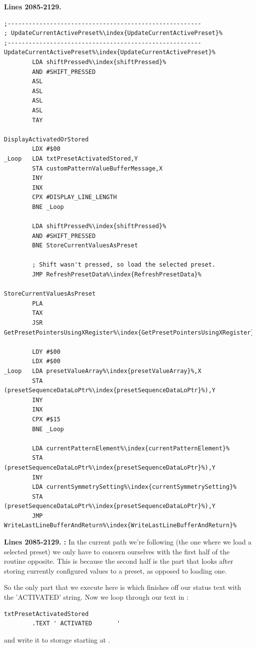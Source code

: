\clearpage
{}
\textbf{Lines 2085-2129. } 
\begin{lstlisting}[escapechar=\%]
;-------------------------------------------------------
; UpdateCurrentActivePreset%\index{UpdateCurrentActivePreset}%
;-------------------------------------------------------
UpdateCurrentActivePreset%\index{UpdateCurrentActivePreset}%    
        LDA shiftPressed%\index{shiftPressed}%
        AND #SHIFT_PRESSED
        ASL 
        ASL 
        ASL 
        ASL 
        TAY 

DisplayActivatedOrStored
        LDX #$00
_Loop   LDA txtPresetActivatedStored,Y
        STA customPatternValueBufferMessage,X
        INY 
        INX 
        CPX #DISPLAY_LINE_LENGTH
        BNE _Loop

        LDA shiftPressed%\index{shiftPressed}%
        AND #SHIFT_PRESSED
        BNE StoreCurrentValuesAsPreset

        ; Shift wasn't pressed, so load the selected preset.
        JMP RefreshPresetData%\index{RefreshPresetData}%

StoreCurrentValuesAsPreset   
        PLA 
        TAX 
        JSR GetPresetPointersUsingXRegister%\index{GetPresetPointersUsingXRegister}%

        LDY #$00
        LDX #$00
_Loop   LDA presetValueArray%\index{presetValueArray}%,X
        STA (presetSequenceDataLoPtr%\index{presetSequenceDataLoPtr}%),Y
        INY 
        INX 
        CPX #$15
        BNE _Loop

        LDA currentPatternElement%\index{currentPatternElement}%
        STA (presetSequenceDataLoPtr%\index{presetSequenceDataLoPtr}%),Y
        INY 
        LDA currentSymmetrySetting%\index{currentSymmetrySetting}%
        STA (presetSequenceDataLoPtr%\index{presetSequenceDataLoPtr}%),Y
        JMP WriteLastLineBufferAndReturn%\index{WriteLastLineBufferAndReturn}%
\end{lstlisting}
\clearpage

\textbf{Lines 2085-2129. :} In the current path we're following (the one where we load a selected preset)
we only have to concern ourselves with the first half of the routine opposite. This is because the second half is the part that looks after storing
currently configured values to a preset, as opposed to loading one.

So the only part that we execute here is  which finishes off our status text with the 'ACTIVATED' string. Now we loop
through our text in :
\begin{lstlisting}[escapechar=\%]
txtPresetActivatedStored
        .TEXT ' ACTIVATED       '
\end{lstlisting}
and write it to storage starting at . 

